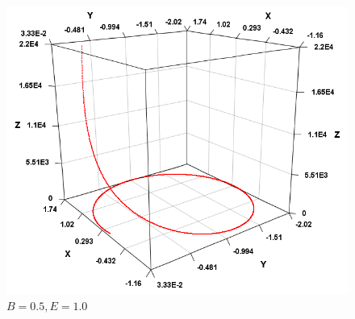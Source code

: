 \documentclass[a4j,titlepage]{jsarticle}
\begin{document}
\begin{figure}[H]
  \centering
  \includegraphics[width=12cm]{3.png}
  \caption{$B=0.5, E=1.0$}
  \label{fig:3}
\end{figure}
\end{document}
